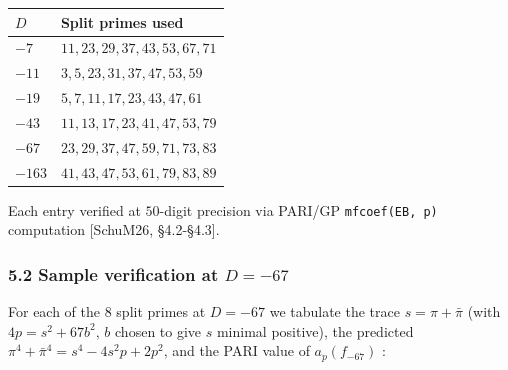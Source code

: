 \documentclass[
  11pt,
  a4paper,
]{amsart}
\begin{document}
\begin{longtable}[]{@{}ll@{}}
\toprule\noalign{}
\(D\) & Split primes used \\
\midrule\noalign{}
\endhead
\bottomrule\noalign{}
\endlastfoot
\(-7\) & \(11, 23, 29, 37, 43, 53, 67, 71\) \\
\(-11\) & \(3, 5, 23, 31, 37, 47, 53, 59\) \\
\(-19\) & \(5, 7, 11, 17, 23, 43, 47, 61\) \\
\(-43\) & \(11, 13, 17, 23, 41, 47, 53, 79\) \\
\(-67\) & \(23, 29, 37, 47, 59, 71, 73, 83\) \\
\(-163\) & \(41, 43, 47, 53, 61, 79, 83, 89\) \\
\end{longtable}

Each entry verified at \(50\)-digit precision via PARI/GP \texttt{mfcoef(EB,\ p)} computation {[}SchuM26, §4.2-§4.3{]}.

\hypertarget{sample-verification-at-d--67}{%
\subsubsection{\texorpdfstring{5.2 Sample verification at \(D = -67\)}{5.2 Sample verification at D = -67}}\label{sample-verification-at-d--67}}

For each of the \(8\) split primes at \(D = -67\) we tabulate the trace \(s = \pi + \bar\pi\) (with \(4p = s^2 + 67 b^2\), \(b\) chosen to give \(s\) minimal positive), the predicted \(\pi^4 + \bar\pi^4 = s^4 - 4 s^2 p + 2 p^2\), and the PARI value of \(a_p(f_{-67})\) :
\end{document}

